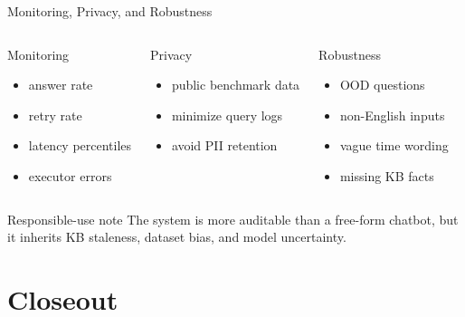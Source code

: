 \begin{frame}[shrink=8]{Monitoring, Privacy, and Robustness}
  \begin{columns}[T]
    \begin{block}{Monitoring}
      \small
      \begin{itemize}
        \item answer rate
        \item retry rate
        \item latency percentiles
        \item executor errors
      \end{itemize}
    \end{block}
    \begin{block}{Privacy}
      \small
      \begin{itemize}
        \item public benchmark data
        \item minimize query logs
        \item avoid PII retention
      \end{itemize}
    \end{block}
    \begin{block}{Robustness}
      \small
      \begin{itemize}
        \item OOD questions
        \item non-English inputs
        \item vague time wording
        \item missing KB facts
      \end{itemize}
    \end{block}
  \end{columns}
  \vspace{0.15cm}
  \begin{alertblock}{Responsible-use note}
    The system is more auditable than a free-form chatbot, but it inherits KB staleness, dataset bias, and model uncertainty.
  \end{alertblock}
\end{frame}

\section{Closeout}

